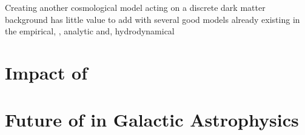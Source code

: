 Creating another cosmological model acting on a discrete dark matter background has little value to add with several good models already existing in the empirical, \cite[e.g.][]{Rodriguez-Puebla2017ConstrainingProperties, Moster2018Emerge10, Behroozi2019UniverseMachine:010, Zavala2012}, analytic \cite[e.g.][]{Somerville2015StarGas, Guo2011FromCosmology, Fontanot2007ReproducingCosmogony, Zoldan2019TheEvolution} and, hydrodynamical

\section{Impact of \steel}



\section{Future of \steel in Galactic Astrophysics}
